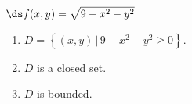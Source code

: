 {$\ds f(x,y) = \sqrt{9-x^2-y^2}$}
{\begin{enumerate}
\item $D = \left\{(x,y)\, |\, 9-x^2-y^2\geq 0\right\}$.
\item $D$ is a closed set.
\item	$D$ is bounded.
\end{enumerate}
}